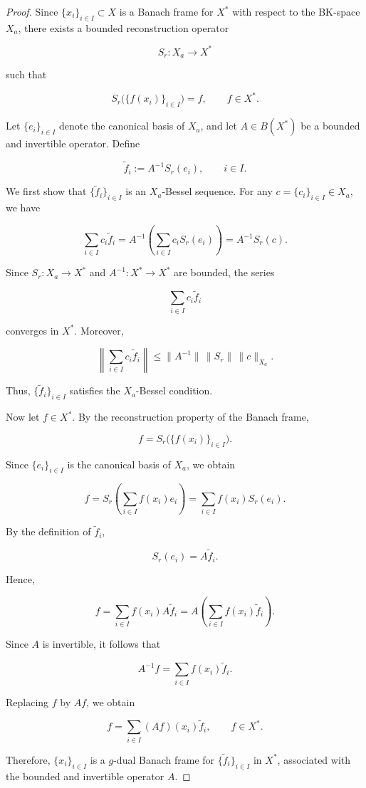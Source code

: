 \documentclass[12pt]{article}
\theoremstyle{definition}
\theoremstyle{remark}
\begin{document}
\begin{proof}  

	Since \(\{x_i\}_{i\in I}\subset X\) is a Banach frame for \(X^*\) with
	respect to the BK-space \(X_a\), there exists a bounded reconstruction
	operator
	
	$$
	S_r:X_a\longrightarrow X^*
	$$
	
	such that
	
	$$
	S_r\big(\{f(x_i)\}_{i\in I}\big)=f,
	\qquad f\in X^*.
	$$
	
	Let \(\{e_i\}_{i\in I}\) denote the canonical basis of \(X_a\), and let
	\(A\in B(X^*)\) be a bounded and invertible operator. Define
	
	$$
	\widetilde{f}_i:=A^{-1}S_r(e_i),
	\qquad i\in I.
	$$
	
	We first show that \(\{\widetilde{f}_i\}_{i\in I}\) is an
	\(X_a\)-Bessel sequence. For any \(c=\{c_i\}_{i\in I}\in X_a\), we have
	
	$$
	\sum_{i\in I}c_i\widetilde{f}_i
	=
	A^{-1}\left(\sum_{i\in I}c_iS_r(e_i)\right)
	=
	A^{-1}S_r(c).
	$$
	
	Since \(S_r:X_a\to X^*\) and \(A^{-1}:X^*\to X^*\) are bounded, the
	series
	
	$$
	\sum_{i\in I}c_i\widetilde{f}_i
	$$
	
	converges in \(X^*\). Moreover,
	
	$$
	\left\|
	\sum_{i\in I}c_i\widetilde{f}_i
	\right\|
	\leq
	\|A^{-1}\|\,\|S_r\|\,\|c\|_{X_a}.
	$$
	
	Thus, \(\{\widetilde{f}_i\}_{i\in I}\) satisfies the
	\(X_a\)-Bessel condition.
	
	Now let \(f\in X^*\). By the reconstruction property of the Banach
	frame,
	
	$$
	f
	=
	S_r\big(\{f(x_i)\}_{i\in I}\big).
	$$
	
	Since \(\{e_i\}_{i\in I}\) is the canonical basis of \(X_a\), we obtain
	
	$$
	f
	=
	S_r\left(\sum_{i\in I}f(x_i)e_i\right)
	=
	\sum_{i\in I}f(x_i)S_r(e_i).
	$$
	
	By the definition of \(\widetilde{f}_i\),
	
	$$
	S_r(e_i)=A\widetilde{f}_i.
	$$
	
	Hence,
	
	$$
	f
	=
	\sum_{i\in I}f(x_i)A\widetilde{f}_i
	=
	A\left(\sum_{i\in I}f(x_i)\widetilde{f}_i\right).
	$$
	
	Since \(A\) is invertible, it follows that
	
	$$
	A^{-1}f
	=
	\sum_{i\in I}f(x_i)\widetilde{f}_i.
	$$
	
	Replacing \(f\) by \(Af\), we obtain
	
	$$
	f
	=
	\sum_{i\in I}(Af)(x_i)\widetilde{f}_i,
	\qquad f\in X^*.
	$$
	
	Therefore, \(\{x_i\}_{i\in I}\) is a \(g\)-dual Banach frame for
	\(\{\widetilde{f}_i\}_{i\in I}\) in \(X^*\), associated with the bounded
	and invertible operator \(A\).


\end{proof}
\end{document}
